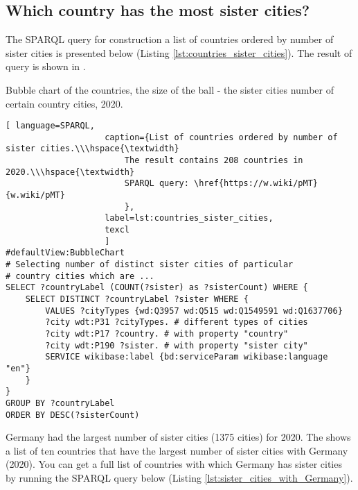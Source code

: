 \subsection{Which country has the most sister cities?}

The SPARQL query for construction a list of countries ordered by number of sister cities is presented below (Listing \ref{lst:countries_sister_cities}). The result of query is shown in .

\begin{marginfigure}[2cm]
{
\setlength{\fboxsep}{0pt}%
\setlength{\fboxrule}{1pt}%
}
	\caption{Bubble chart of the countries, the size of the ball - the sister cities number of certain country cities, 2020.}
\end{marginfigure}

\begin{lstlisting}[ language=SPARQL, 
                    caption={List of countries ordered by number of sister cities.\\\hspace{\textwidth}
                        The result contains 208 countries in 2020.\\\hspace{\textwidth}
                        SPARQL query: \href{https://w.wiki/pMT}{w.wiki/pMT}
                        },
                    label=lst:countries_sister_cities,
                    texcl 
                    ]
#defaultView:BubbleChart
# Selecting number of distinct sister cities of particular  
# country cities which are ... 
SELECT ?countryLabel (COUNT(?sister) as ?sisterCount) WHERE { 
	SELECT DISTINCT ?countryLabel ?sister WHERE {
		VALUES ?cityTypes {wd:Q3957 wd:Q515 wd:Q1549591 wd:Q1637706}
		?city wdt:P31 ?cityTypes. # different types of cities
		?city wdt:P17 ?country. # with property "country"
		?city wdt:P190 ?sister. # with property "sister city"
		SERVICE wikibase:label {bd:serviceParam wikibase:language "en"}
	}                                 
}
GROUP BY ?countryLabel
ORDER BY DESC(?sisterCount)
\end{lstlisting}%

Germany had the largest number of sister cities (1375 cities) for 2020. The  shows a list of ten countries that have the largest number of sister cities with Germany (2020). You can get a full list of countries with which Germany has sister cities by running the SPARQL query below (Listing \ref{lst:sister_cities_with_Germany}).

